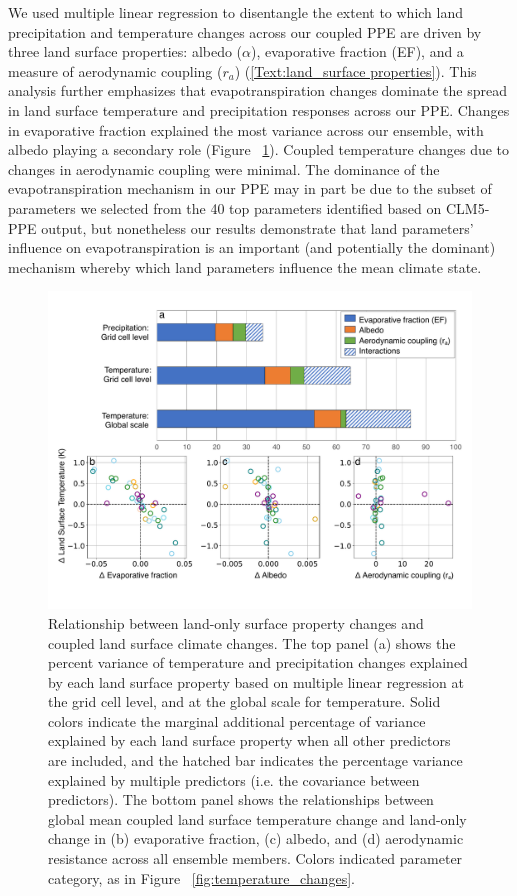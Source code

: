 \documentclass[draft]{agujournal2019}
\begin{document}
We used multiple linear regression to disentangle the extent to which land precipitation and temperature changes across our coupled PPE are driven by three land surface properties: albedo ($\alpha$), evaporative fraction (EF), and a measure of aerodynamic coupling ($r_a$) (\ref{Text:land_surface properties}). This analysis further emphasizes that evapotranspiration changes dominate the spread in land surface temperature and precipitation responses across our PPE. Changes in evaporative fraction explained the most variance across our ensemble, with albedo playing a secondary role (Figure ~\ref{fig:mechanism_disentangling}). Coupled temperature changes due to changes in aerodynamic coupling were minimal. The dominance of the evapotranspiration mechanism in our PPE may in part be due to the subset of parameters we selected from the 40 top parameters identified based on CLM5-PPE output, but nonetheless our results demonstrate that land parameters’ influence on evapotranspiration is an important (and potentially the dominant) mechanism whereby which land parameters influence the mean climate state.

\begin{figure}
\noindent\includegraphics[width=\textwidth]{figs/Figure4.pdf}
\caption{Relationship between land-only surface property changes and coupled land surface climate changes. The top panel (a) shows the percent variance of temperature and precipitation changes explained by each land surface property based on multiple linear regression at the grid cell level, and at the global scale for temperature. Solid colors indicate the marginal additional percentage of variance explained by each land surface property when all other predictors are included, and the hatched bar indicates the percentage variance explained by multiple predictors (i.e. the covariance between predictors). The bottom panel shows the relationships between global mean coupled land surface temperature change and land-only change in (b) evaporative fraction, (c) albedo, and (d) aerodynamic resistance across all ensemble members. Colors indicated parameter category, as in Figure ~\ref{fig:temperature_changes}.}
\label{fig:mechanism_disentangling}
\end{figure}
\end{document}
